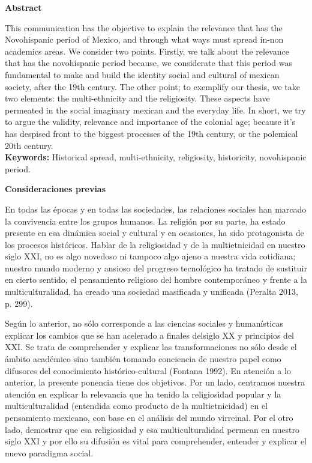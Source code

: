 \textbf{Abstract}
 
This communication has the objective to explain the relevance that has the
Novohispanic period of Mexico, and through what ways must spread in-non
academics areas. We consider two points. Firstly, we talk about the relevance
that has the novohispanic period because, we considerate that this period was
fundamental to make and build the identity social and cultural of mexican
society, after the 19th century. The other point; to exemplify our thesis, we
take two elements: the multi-ethnicity and the religiosity. These aspects have
permeated in the social imaginary mexican and the everyday life. In short, we
try to argue the validity, relevance and importance of the colonial age;
because it’s has despised front to the biggest processes of the 19th century,
or the polemical 20th century.\\
\textbf{Keywords:} Historical spread, multi-ethnicity, religiosity, historicity,
novohispanic period.


\bigskip
\textbf{Consideraciones previas}

En todas las épocas y en todas las sociedades, las relaciones sociales han
marcado la convivencia entre los grupos humanos. La religión por su parte, ha
estado presente en esa dinámica social y cultural y en ocasiones, ha sido
protagonista de los procesos históricos. Hablar de la religiosidad y de la
multietnicidad en nuestro siglo XXI, no es algo novedoso ni tampoco algo ajeno
a nuestra vida cotidiana; nuestro mundo moderno y ansioso del progreso
tecnológico ha tratado de sustituir en cierto sentido, el pensamiento religioso
del hombre contemporáneo y frente a la multiculturalidad, ha creado una
sociedad masificada y unificada (Peralta 2013, p. 299).

\enlargethispage{1\baselineskip}
Según lo anterior, no sólo corresponde a las ciencias sociales y humanísticas
explicar los cambios que se han acelerado a finales del\linebreak siglo XX y principios del XXI.
Se trata de comprehender y explicar las transformaciones no sólo desde el
ámbito académico sino también tomando conciencia de nuestro papel como
difusores del conocimiento histórico-cultural (Fontana 1992). En atención a lo
anterior, la presente ponencia tiene dos objetivos. Por un lado, centramos
nuestra atención en explicar la relevancia que ha tenido la religiosidad
popular y la multiculturalidad (entendida como producto de la multietnicidad)
en el pensamiento mexicano, con base en el análisis del mundo virreinal. Por el
otro lado, demostrar que esa religiosidad y esa multiculturalidad permean en
nuestro siglo XXI y por ello su difusión es vital para comprehender, entender y
explicar el nuevo paradigma social.


